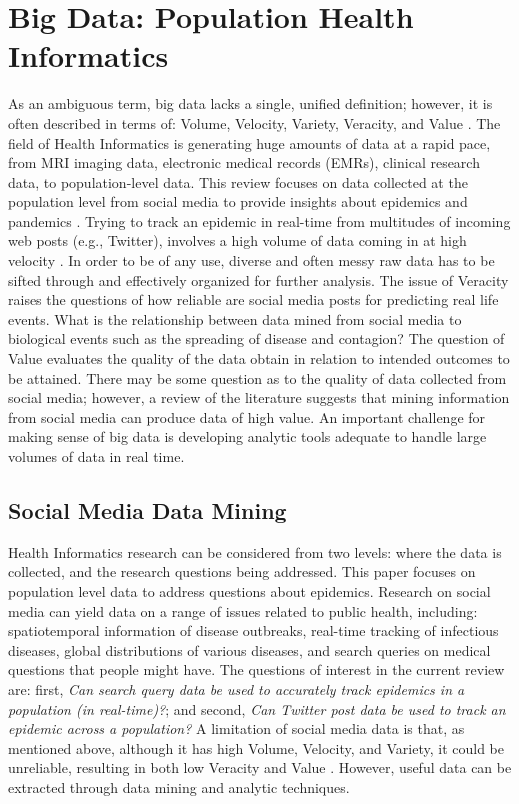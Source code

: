 \documentclass[sigconf]{acmart}
\begin{document}
\section{Big Data: Population Health Informatics}

As an ambiguous term, big data lacks a single, unified definition; however, it 
is often described in terms of: Volume, Velocity, Variety, Veracity, and Value 
\cite{demchenko12}. The field of Health Informatics is generating huge amounts 
of data at a rapid pace, from MRI imaging data, electronic medical records (EMRs), 
clinical research data, to population-level data. This review focuses on data 
collected at the population level from social media to provide insights about 
epidemics and pandemics  \cite{hay13, herland14}. Trying to track an epidemic in 
real-time from multitudes of incoming web posts (e.g., Twitter), involves a high 
volume of data coming in at high velocity \cite{lamb13, paul14}. In order to be 
of any use, diverse and often messy raw data has to be sifted through and effectively 
organized for further analysis. The issue of Veracity raises the questions of how 
reliable are social media posts for predicting real life events. What is the 
relationship between data mined from social media to biological events such as 
the spreading of disease and contagion? The question of Value evaluates the quality 
of the data obtain in relation to intended outcomes to be attained. There may be 
some question as to the quality of data collected from social media; however, a 
review of the literature suggests that mining information from social media can 
produce data of high value. An important challenge for making sense of big data 
is developing analytic tools adequate to handle large volumes of data in real time.


\subsection{Social Media Data Mining}

Health Informatics research can be considered from two levels: where the data 
is collected, and the research questions being addressed. This paper focuses on 
population level data to address questions about epidemics. Research on social 
media can yield data on a range of issues related to public health, including: 
spatiotemporal information of disease outbreaks, real-time tracking of infectious
diseases, global distributions of various diseases, and search queries on medical 
questions that people might have. The questions of interest in the current review 
are: first, \textit{Can search query data be used to accurately track epidemics in 
a population (in real-time)?};  and second, \textit{Can Twitter post data be used 
to track an epidemic across a population?} A limitation of social media data is 
that, as mentioned above, although it has high Volume, Velocity, and Variety, it 
could be unreliable, resulting in both low Veracity and Value \cite{hay14, lazer14}. 
However, useful data can be extracted through data mining and analytic techniques. 
\end{document}
